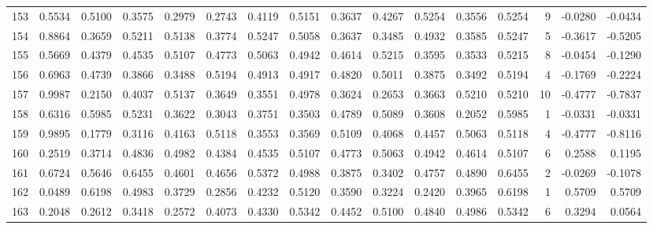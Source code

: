 \begin{tabular}{lrrrrrrrrrrrrrrr}
153 &      0.5534 &  0.5100 &  0.3575 &  0.2979 &  0.2743 &  0.4119 &  0.5151 &  0.3637 &  0.4267 &  0.5254 &   0.3556 &     0.5254 &      9 &                   -0.0280 &                    -0.0434 \\
154 &      0.8864 &  0.3659 &  0.5211 &  0.5138 &  0.3774 &  0.5247 &  0.5058 &  0.3637 &  0.3485 &  0.4932 &   0.3585 &     0.5247 &      5 &                   -0.3617 &                    -0.5205 \\
155 &      0.5669 &  0.4379 &  0.4535 &  0.5107 &  0.4773 &  0.5063 &  0.4942 &  0.4614 &  0.5215 &  0.3595 &   0.3533 &     0.5215 &      8 &                   -0.0454 &                    -0.1290 \\
156 &      0.6963 &  0.4739 &  0.3866 &  0.3488 &  0.5194 &  0.4913 &  0.4917 &  0.4820 &  0.5011 &  0.3875 &   0.3492 &     0.5194 &      4 &                   -0.1769 &                    -0.2224 \\
157 &      0.9987 &  0.2150 &  0.4037 &  0.5137 &  0.3649 &  0.3551 &  0.4978 &  0.3624 &  0.2653 &  0.3663 &   0.5210 &     0.5210 &     10 &                   -0.4777 &                    -0.7837 \\
158 &      0.6316 &  0.5985 &  0.5231 &  0.3622 &  0.3043 &  0.3751 &  0.3503 &  0.4789 &  0.5089 &  0.3608 &   0.2052 &     0.5985 &      1 &                   -0.0331 &                    -0.0331 \\
159 &      0.9895 &  0.1779 &  0.3116 &  0.4163 &  0.5118 &  0.3553 &  0.3569 &  0.5109 &  0.4068 &  0.4457 &   0.5063 &     0.5118 &      4 &                   -0.4777 &                    -0.8116 \\
160 &      0.2519 &  0.3714 &  0.4836 &  0.4982 &  0.4384 &  0.4535 &  0.5107 &  0.4773 &  0.5063 &  0.4942 &   0.4614 &     0.5107 &      6 &                    0.2588 &                     0.1195 \\
161 &      0.6724 &  0.5646 &  0.6455 &  0.4601 &  0.4656 &  0.5372 &  0.4988 &  0.3875 &  0.3402 &  0.4757 &   0.4890 &     0.6455 &      2 &                   -0.0269 &                    -0.1078 \\
162 &      0.0489 &  0.6198 &  0.4983 &  0.3729 &  0.2856 &  0.4232 &  0.5120 &  0.3590 &  0.3224 &  0.2420 &   0.3965 &     0.6198 &      1 &                    0.5709 &                     0.5709 \\
163 &      0.2048 &  0.2612 &  0.3418 &  0.2572 &  0.4073 &  0.4330 &  0.5342 &  0.4452 &  0.5100 &  0.4840 &   0.4986 &     0.5342 &      6 &                    0.3294 &                     0.0564 \\

\end{tabular}
